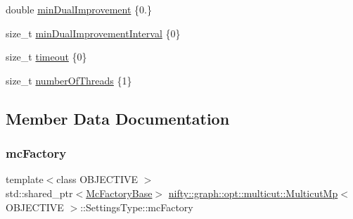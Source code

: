 \begin{DoxyCompactItemize}
\item 
double \hyperlink{structnifty_1_1graph_1_1opt_1_1multicut_1_1MulticutMp_1_1SettingsType_a69d310af3584d59676ac1b65e2f6acbe}{min\+Dual\+Improvement} \{0.\}
\item 
size\+\_\+t \hyperlink{structnifty_1_1graph_1_1opt_1_1multicut_1_1MulticutMp_1_1SettingsType_aa935a2754f61233519645ddaf2d2e7b8}{min\+Dual\+Improvement\+Interval} \{0\}
\item 
size\+\_\+t \hyperlink{structnifty_1_1graph_1_1opt_1_1multicut_1_1MulticutMp_1_1SettingsType_afdb8343809bbe13cf06364664a2a449b}{timeout} \{0\}
\item 
size\+\_\+t \hyperlink{structnifty_1_1graph_1_1opt_1_1multicut_1_1MulticutMp_1_1SettingsType_a56754ff6b37de87a35a52e91d2aa33e8}{number\+Of\+Threads} \{1\}
\end{DoxyCompactItemize}


\subsection{Member Data Documentation}
\mbox{\label{structnifty_1_1graph_1_1opt_1_1multicut_1_1MulticutMp_1_1SettingsType_ab4716729830156eee7fc8c8a89843d1e}} 
\subsubsection{\texorpdfstring{mc\+Factory}{mcFactory}}
{\footnotesize\ttfamily template$<$class O\+B\+J\+E\+C\+T\+I\+VE $>$ \\
std\+::shared\+\_\+ptr$<$\hyperlink{classnifty_1_1graph_1_1opt_1_1multicut_1_1MulticutMp_ab1974bc35fb66895a3a7bfc820f9b78d}{Mc\+Factory\+Base}$>$ \hyperlink{classnifty_1_1graph_1_1opt_1_1multicut_1_1MulticutMp}{nifty\+::graph\+::opt\+::multicut\+::\+Multicut\+Mp}$<$ O\+B\+J\+E\+C\+T\+I\+VE $>$\+::Settings\+Type\+::mc\+Factory}

\mbox{\label{structnifty_1_1graph_1_1opt_1_1multicut_1_1MulticutMp_1_1SettingsType_a69d310af3584d59676ac1b65e2f6acbe}} 
